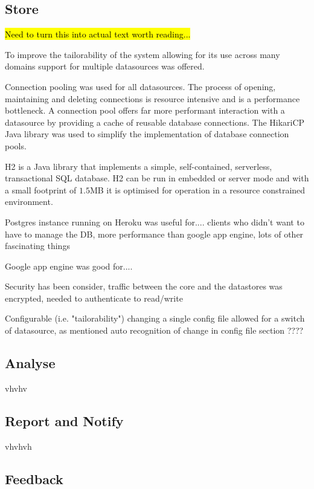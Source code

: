 \documentclass[10pt,a4paper]{article}
\begin{document}


\subsection{Store}
\label{sec:store}

\hl{Need to turn this into actual text worth reading...}

To improve the tailorability of the system allowing for its use across many domains support for multiple datasources was offered. 

Connection pooling was used for all datasources. The process of opening, maintaining and deleting connections is resource intensive and is a performance bottleneck. A connection pool offers far more performant interaction with a datasource by providing a cache of reusable database connections. The HikariCP Java library was used to simplify the implementation of database connection pools. 

H2 is a Java library that implements a simple, self-contained, serverless, transactional SQL database. H2 can be run in embedded or server mode and with a small footprint of $1.5$MB it is optimised for operation in a resource constrained environment.

Postgres instance running on Heroku was useful for.... clients who didn't want to have to manage the DB, more performance than google app engine, lots of other fascinating things

Google app engine was good for....

Security has been consider, traffic between the core and the datastores was encrypted, needed to authenticate to read/write

Configurable (i.e. "tailorability") changing a single config file allowed for a switch of datasource, as mentioned auto recognition of change in config file section ????


\subsection{Analyse}
\label{sec:analyse}
vhvhv

\subsection{Report and Notify}
\label{sec:report}
vhvhvh

\subsection{Feedback}
\label{sec:feedback}
\end{document}
